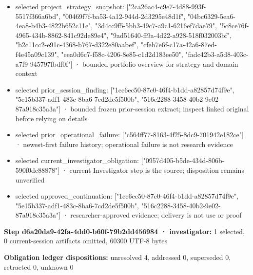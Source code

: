 \documentclass[11pt]{article}
\begin{document}
\begin{itemize}
\item selected project\_strategy\_snapshot: ["2ca26ac4-c9e7-4d88-993f-5517f366a6bd", "00469f7f-ba53-4a12-944d-2d3295e48d1f", "04bc6329-5ea6-4ea8-b4b3-4822b652c11e", "3d4cc9f5-5bb3-49c7-a9c1-6216ef7dae79", "5c8ce76f-4965-434b-8862-841c92de89e4", "9ad51640-ff9a-4d22-a928-518f032003bf", "b2c11cc2-e91c-4368-b767-d322e80aabef", "cfeb7e6f-c17a-42a6-87ed-f4e45a09c139", "eea0d6c7-f58c-4206-8e85-c1d2d183ee50", "fadc42b3-a5d8-403c-a7f9-945797fbdf0f"] · bounded portfolio overview for strategy and domain context
\item selected prior\_session\_finding: ["1cc6ec50-87c0-46f4-b1dd-a82857d74f9e", "5e15b337-adf1-483c-8ba6-7cd2de5f500b", "516c2288-3458-40b2-9e02-87a918c35a3a"] · bounded frozen prior-session extract; inspect linked original before relying on details
\item selected prior\_operational\_failure: ["c564ff77-8163-4f25-8dc9-701942e182ce"] · newest-first failure history; operational failure is not research evidence
\item selected current\_investigator\_obligation: ["0957d405-b5de-434d-806b-590f0dc88878"] · current Investigator step is the source; disposition remains unverified
\item selected approved\_continuation: ["1cc6ec50-87c0-46f4-b1dd-a82857d74f9e", "5e15b337-adf1-483c-8ba6-7cd2de5f500b", "516c2288-3458-40b2-9e02-87a918c35a3a"] · researcher-approved evidence; delivery is not use or proof
\end{itemize}
\textbf{Step d6a20da9-42fa-4dd0-b60f-79b2dd456984 · investigator:} 1 selected, 0 current-session artifacts omitted, 60300 UTF-8 bytes\par
\textbf{Obligation ledger dispositions:} unresolved 4, addressed 0, superseded 0, retracted 0, unknown 0\par
\end{document}
